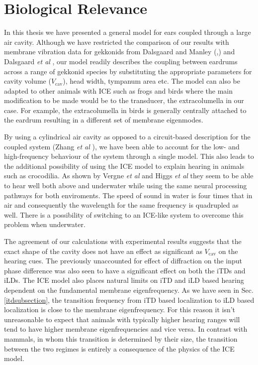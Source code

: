 \section{Biological Relevance}
In this thesis we have presented a general model for ears coupled through a large air cavity. Although we
have restricted the comparison of our results with membrane vibration data for gekkonids from Dalsgaard and Manley (\cite{dalsgaardmanley1},\cite{dalsgaardmanley2})
and Dalsgaard \emph{et al} \cite{dalsgaardtangcarr}, our model readily describes the coupling between eardrums across a range of gekkonid species by substituting
the appropriate parameters for cavity volume ($V_{\mathrm{cav}}$), head width, tympanum area etc. The model can also be adapted to other animals with ICE such as
frogs and birds where the main modification to be made would be to the transducer, the extracolumella in our case. For example, the extracolumella in birds is generally
centrally attached to the eardrum \cite{millsavianmiddleear} resulting in a different set of membrane eigenmodes. 

By using a cylindrical air cavity as opposed to a circuit-based description for the coupled system (Zhang \emph{et al} \cite{zhanghallam}), we have been able to account for the
low- and high-frequency behaviour of the system through a single model. This also leads to the additional possibility of using the ICE model to explain hearing in
animals such as crocodilia. As shown by Vergne \emph{et al} \cite{vergnecrocodilia} and Higgs \emph{et al} \cite{higgscrocodilia} they seem to be able to hear well both above and underwater while
using the same neural processing pathways for both enviroments.
The speed of sound in water is four times that in air and consequently the wavelength for the same frequency is quadrupled as well. There is a possibility of switching to an ICE-like 
system to overcome this problem when underwater.

The agreement of our calculations with
experimental results suggests that the exact shape of the cavity does not have an effect as significant as $V_{\mathrm{cav}}$ on the hearing cues.  The previously
unaccounted for effect of diffraction on the input phase difference was also seen to have a significant effect on both the iTDs and iLDs.
The ICE model also places natural limits on iTD and iLD based hearing dependent on the fundamental membrane eigenfrequency. As we have seen in Sec. \ref{itdsubsection},
the transition frequency from iTD based localization to iLD based localization is close to the membrane eigenfrequency. For this reason it isn't unreasonable to expect that animals with typically
higher hearing ranges will tend to have higher membrane eigenfrequencies and vice versa. In contrast with mammals, in whom this transition is determined by their size, the transition
between the two regimes is entirely a consequence of the physics of the ICE model.

